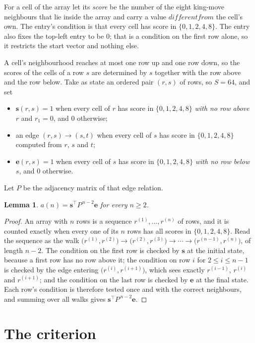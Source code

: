 \documentclass[11pt,a4paper]{article}
\theoremstyle{plain}
\newtheorem{lemma}[theorem]{Lemma}
\theoremstyle{definition}
\begin{document}
For a cell of the array let its \emph{score} be the number of the eight king-move neighbours that lie inside
the array and carry a value $different from$ the cell's own. The entry's condition is that every cell
has score in $\{0,1,2,4,8\}$. The entry also fixes the top-left entry to be $0$; that is a condition on the first row alone, so it restricts the start vector and nothing else.

A cell's neighbourhood reaches at most one row up and one row down, so the scores of the
cells of a row $s$ are determined by $s$ together with the row above and the row below.
Take as state an ordered pair $(r,s)$ of rows, so $S=64$, and set
\begin{itemize}
\item $\mathbf{s}(r,s)=1$ when every cell of $r$ has score in $\{0,1,2,4,8\}$ \emph{with no row
above $r$} and $r_1=0$, and $0$ otherwise;
\item an edge $(r,s)\to(s,t)$ when every cell of $s$ has score in $\{0,1,2,4,8\}$ computed from
$r$, $s$ and $t$;
\item $\mathbf{e}(r,s)=1$ when every cell of $s$ has score in $\{0,1,2,4,8\}$ \emph{with no row
below $s$}, and $0$ otherwise.
\end{itemize}
Let $P$ be the adjacency matrix of that edge relation.

\begin{lemma}\label{lem:walk}
$a(n)=\mathbf{s}^{\!\top}P^{\,n-2}\mathbf{e}$ for every $n\ge2$.
\end{lemma}

\begin{proof}
An array with $n$ rows is a sequence $r^{(1)},\dots,r^{(n)}$ of rows, and it is counted
exactly when every one of its $n$ rows has all scores in $\{0,1,2,4,8\}$. Read the sequence as the
walk $\bigl(r^{(1)},r^{(2)}\bigr)\to\bigl(r^{(2)},r^{(3)}\bigr)\to\cdots\to
\bigl(r^{(n-1)},r^{(n)}\bigr)$, of length $n-2$. The condition on the first row is
checked by $\mathbf{s}$ at the initial state, because a first row has no row above it; the
condition on row $i$ for $2\le i\le n-1$ is checked by the edge entering
$\bigl(r^{(i)},r^{(i+1)}\bigr)$, which sees exactly $r^{(i-1)}$, $r^{(i)}$ and
$r^{(i+1)}$; and the condition on the last row is checked by $\mathbf{e}$ at the final
state. Each row's condition is therefore tested once and with the correct neighbours, and
summing over all walks gives $\mathbf{s}^{\!\top}P^{\,n-2}\mathbf{e}$.
\end{proof}

\section{The criterion}
\end{document}
